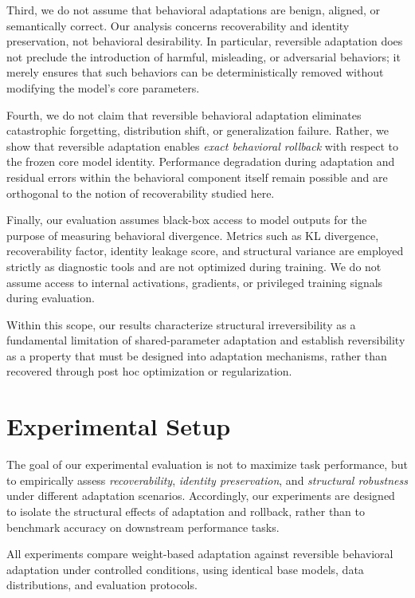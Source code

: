 \documentclass[10pt]{article}
\begin{document}
	Third, we do not assume that behavioral adaptations are benign, aligned, or semantically correct. Our analysis concerns recoverability and identity preservation, not behavioral desirability. In particular, reversible adaptation does not preclude the introduction of harmful, misleading, or adversarial behaviors; it merely ensures that such behaviors can be deterministically removed without modifying the model’s core parameters.
	
	Fourth, we do not claim that reversible behavioral adaptation eliminates catastrophic forgetting, distribution shift, or generalization failure. Rather, we show that reversible adaptation enables \emph{exact behavioral rollback} with respect to the frozen core model identity. Performance degradation during adaptation and residual errors within the behavioral component itself remain possible and are orthogonal to the notion of recoverability studied here.
	
	Finally, our evaluation assumes black-box access to model outputs for the purpose of measuring behavioral divergence. Metrics such as KL divergence, recoverability factor, identity leakage score, and structural variance are employed strictly as diagnostic tools and are not optimized during training. We do not assume access to internal activations, gradients, or privileged training signals during evaluation.
	
	Within this scope, our results characterize structural irreversibility as a fundamental limitation of shared-parameter adaptation and establish reversibility as a property that must be designed into adaptation mechanisms, rather than recovered through post hoc optimization or regularization.
	
	
	\section{Experimental Setup}
	\label{sec:exp_setup}
	
	The goal of our experimental evaluation is not to maximize task performance, but to empirically assess \emph{recoverability}, \emph{identity preservation}, and \emph{structural robustness} under different adaptation scenarios. Accordingly, our experiments are designed to isolate the structural effects of adaptation and rollback, rather than to benchmark accuracy on downstream performance tasks.
	
	All experiments compare weight-based adaptation against reversible behavioral adaptation under controlled conditions, using identical base models, data distributions, and evaluation protocols.
	
\end{document}
